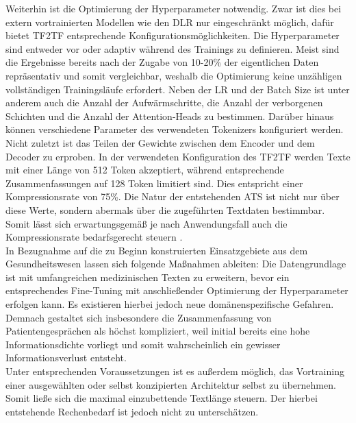 \noindent
Weiterhin ist die Optimierung der Hyperparameter notwendig. Zwar ist dies bei extern vortrainierten Modellen wie den \ac{DLR} nur eingeschränkt möglich, dafür bietet \ac{TF2TF} entsprechende Konfigurationsmöglichkeiten. Die Hyperparameter sind entweder vor oder adaptiv während des Trainings zu definieren. Meist sind die Ergebnisse bereits nach der Zugabe von 10-20\% der eigentlichen Daten repräsentativ und somit vergleichbar, weshalb die Optimierung keine unzähligen vollständigen Trainingsläufe erfordert. Neben der \ac{LR} und der Batch Size ist unter anderem auch die Anzahl der Aufwärmschritte, die Anzahl der verborgenen Schichten und die Anzahl der Attention-Heads zu bestimmen. Darüber hinaus können verschiedene Parameter des verwendeten Tokenizers konfiguriert werden. Nicht zuletzt ist das Teilen der Gewichte zwischen dem Encoder und dem Decoder zu erproben. In der verwendeten Konfiguration des \ac{TF2TF} werden Texte mit einer Länge von 512 Token akzeptiert, während entsprechende Zusammenfassungen auf 128 Token limitiert sind. Dies entspricht einer Kompressionsrate von 75\%. Die Natur der entstehenden \ac{ATS} ist nicht nur über diese Werte, sondern abermals über die zugeführten Textdaten bestimmbar. Somit lässt sich erwartungsgemäß je nach Anwendungsfall auch die Kompressionsrate bedarfsgerecht steuern \cite[S.~14-15]{NIT19}.\\

\noindent
In Bezugnahme auf die zu Beginn konstruierten Einsatzgebiete aus dem Gesundheitswesen lassen sich folgende Maßnahmen ableiten: Die Datengrundlage ist mit umfangreichen medizinischen Texten zu erweitern, bevor ein entsprechendes Fine-Tuning mit anschließender Optimierung der Hyperparameter erfolgen kann. Es existieren hierbei jedoch neue domänenspezifische Gefahren. Demnach gestaltet sich insbesondere die Zusammenfassung von Patientengesprächen als höchst kompliziert, weil initial bereits eine hohe Informationsdichte vorliegt und somit wahrscheinlich ein gewisser Informationsverlust entsteht.\\

\noindent
Unter entsprechenden Voraussetzungen ist es außerdem möglich, das Vortraining einer ausgewählten oder selbst konzipierten Architektur selbst zu übernehmen. Somit ließe sich die maximal einzubettende Textlänge steuern. Der hierbei entstehende Rechenbedarf ist jedoch nicht zu unterschätzen.
